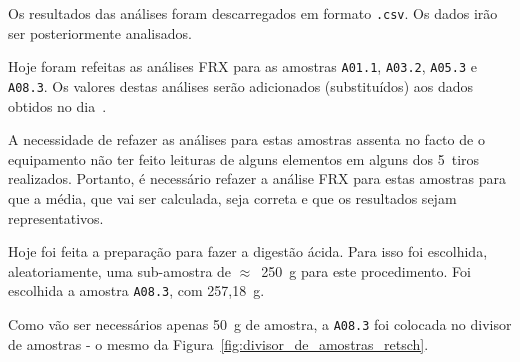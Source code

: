 Os resultados das análises foram descarregados em formato \texttt{.csv}.
Os dados irão ser posteriormente analisados.

\hrulefill



Hoje foram refeitas as análises FRX para as amostras \texttt{A01.1}, \texttt{A03.2}, \texttt{A05.3} e \texttt{A08.3}.
Os valores destas análises serão adicionados (substituídos) aos dados obtidos no dia~.

A necessidade de refazer as análises para estas amostras assenta no facto de o equipamento não ter feito leituras de alguns elementos em alguns dos 5~tiros realizados.
Portanto, é necessário refazer a análise FRX para estas amostras para que a média, que vai ser calculada, seja correta e que os resultados sejam representativos.

\hrulefill

\label{day:7-novembro-2024}

Hoje foi feita a preparação para fazer a digestão ácida.
Para isso foi escolhida, aleatoriamente, uma sub-amostra de $\approx$~250~g para este procedimento.
Foi escolhida a amostra \texttt{A08.3}, com 257,18~g.

Como vão ser necessários apenas 50~g de amostra, a \texttt{A08.3} foi colocada no divisor de amostras - o mesmo da Figura~\ref{fig:divisor_de_amostras_retsch}.

